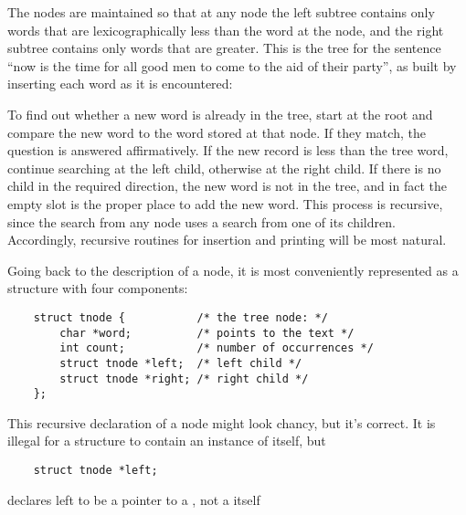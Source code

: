 The nodes are maintained so that at any node the left subtree contains only words that are lexicographically less than the word at the node, and the right subtree contains only words that are greater.
This is the tree for the sentence ``now is the time for all good men to come to the aid of their party'', as built by inserting each word as it is encountered:

To find out whether a new word is already in the tree, start at the root and compare the new word to the word stored at that node.
If they match, the question is answered affirmatively.
If the new record is less than the tree word, continue searching at the left child, otherwise at the right child.
If there is no child in the required direction, the new word is not in the tree, and in fact the empty slot is the proper place to add the new word.
This process is recursive, since the search from any node uses a search from one of its children.
Accordingly, recursive routines for insertion and printing will be most natural.

Going back to the description of a node, it is most conveniently represented as a structure with four components:
\begin{lstlisting}
	struct tnode {        	 /* the tree node: */
		char *word;   		 /* points to the text */
		int count; 			 /* number of occurrences */
		struct tnode *left;	 /* left child */
		struct tnode *right; /* right child */
	};
\end{lstlisting}
This recursive declaration of a node might look chancy, but it's correct. It is illegal for a structure to contain an instance of itself, but
\begin{lstlisting}
	struct tnode *left;
\end{lstlisting}
declares left to be a pointer to a , not a  itself

